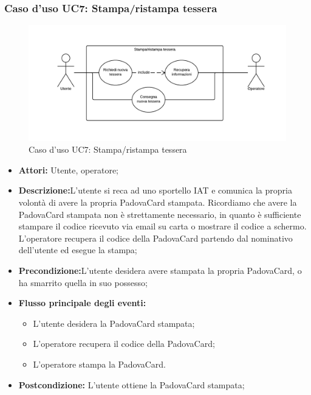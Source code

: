 \subsubsection{Caso d'uso UC7: Stampa/ristampa tessera}
\begin{figure}[H]
\centering
\includegraphics[width=1\textwidth]{images/UC7.png}
\caption{Caso d'uso UC7: Stampa/ristampa tessera}
\end{figure}
\begin{itemize}
\item \textbf{Attori:} Utente, operatore;
\item \textbf{Descrizione:}L'utente si reca ad uno sportello IAT e comunica la propria volontà di avere la propria PadovaCard stampata. Ricordiamo che avere la PadovaCard stampata non è strettamente necessario, in quanto è sufficiente stampare il codice ricevuto via email su carta o mostrare il codice a schermo. L'operatore recupera il codice della PadovaCard partendo dal nominativo dell'utente ed esegue la stampa;
\item \textbf{Precondizione:}L'utente desidera avere stampata la propria PadovaCard, o ha smarrito quella in suo possesso;
\item \textbf{Flusso principale degli eventi:}
	\begin{itemize}
    	\item L'utente desidera la PadovaCard stampata;
        \item L'operatore recupera il codice della PadovaCard;
        \item L'operatore stampa la PadovaCard.
    \end{itemize}
\item \textbf{Postcondizione:}  L'utente ottiene la PadovaCard stampata;
\end{itemize}

